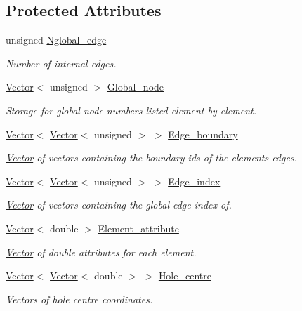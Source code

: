 \subsection*{Protected Attributes}
\begin{DoxyCompactItemize}
\item 
unsigned \hyperlink{classoomph_1_1TriangleScaffoldMesh_a5a054950a3e779af9dbe9d062f1c2968}{Nglobal\+\_\+edge}
\begin{DoxyCompactList}\small\item\em Number of internal edges. \end{DoxyCompactList}\item 
\hyperlink{classoomph_1_1Vector}{Vector}$<$ unsigned $>$ \hyperlink{classoomph_1_1TriangleScaffoldMesh_a3431de685a5eb8989e9bbc47891ebde2}{Global\+\_\+node}
\begin{DoxyCompactList}\small\item\em Storage for global node numbers listed element-\/by-\/element. \end{DoxyCompactList}\item 
\hyperlink{classoomph_1_1Vector}{Vector}$<$ \hyperlink{classoomph_1_1Vector}{Vector}$<$ unsigned $>$ $>$ \hyperlink{classoomph_1_1TriangleScaffoldMesh_aaf277ebb4f0d73ab9f4211884b5cbf7c}{Edge\+\_\+boundary}
\begin{DoxyCompactList}\small\item\em \hyperlink{classoomph_1_1Vector}{Vector} of vectors containing the boundary ids of the elements\textquotesingle{} edges. \end{DoxyCompactList}\item 
\hyperlink{classoomph_1_1Vector}{Vector}$<$ \hyperlink{classoomph_1_1Vector}{Vector}$<$ unsigned $>$ $>$ \hyperlink{classoomph_1_1TriangleScaffoldMesh_af3a887e26d82342a8cf6d45ef2eb2f79}{Edge\+\_\+index}
\begin{DoxyCompactList}\small\item\em \hyperlink{classoomph_1_1Vector}{Vector} of vectors containing the global edge index of. \end{DoxyCompactList}\item 
\hyperlink{classoomph_1_1Vector}{Vector}$<$ double $>$ \hyperlink{classoomph_1_1TriangleScaffoldMesh_a5eefdeebf6e15c37bf5bc5e8cf89242a}{Element\+\_\+attribute}
\begin{DoxyCompactList}\small\item\em \hyperlink{classoomph_1_1Vector}{Vector} of double attributes for each element. \end{DoxyCompactList}\item 
\hyperlink{classoomph_1_1Vector}{Vector}$<$ \hyperlink{classoomph_1_1Vector}{Vector}$<$ double $>$ $>$ \hyperlink{classoomph_1_1TriangleScaffoldMesh_aedefdb2150daf1062a7c5ac772eecbfd}{Hole\+\_\+centre}
\begin{DoxyCompactList}\small\item\em Vectors of hole centre coordinates. \end{DoxyCompactList}\end{DoxyCompactItemize}
